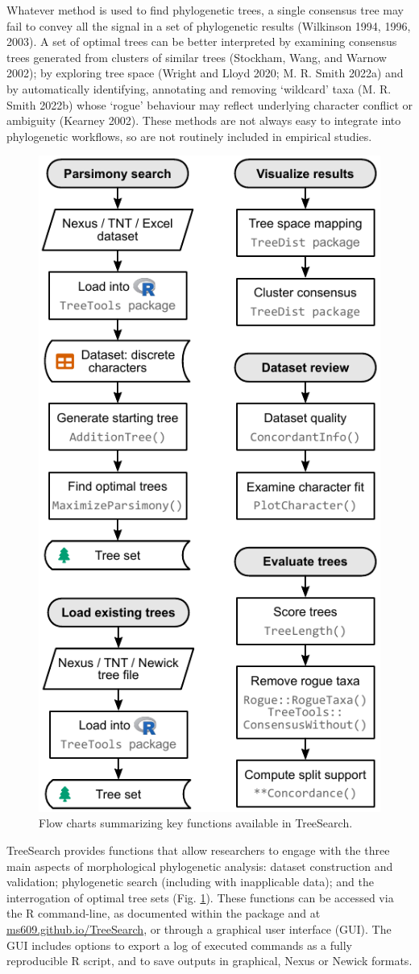 Whatever method is used to find phylogenetic trees, a single consensus tree may
fail to convey all the signal in a set of phylogenetic results (Wilkinson 1994, 1996, 2003). A set of optimal trees can be better
interpreted by examining consensus trees generated from clusters of similar
trees (Stockham, Wang, and Warnow 2002); by exploring tree space (Wright and Lloyd 2020; M. R. Smith 2022a) and by
automatically identifying, annotating and removing `wildcard' taxa (M. R. Smith 2022b)
whose `rogue' behaviour may reflect underlying character conflict or ambiguity
(Kearney 2002). These methods are not always easy to integrate into phylogenetic
workflows, so are not routinely included in empirical studies.

\begin{figure}

{\centering \includegraphics[width=0.6\linewidth]{Flow} 

}

\caption{Flow charts summarizing key functions available in TreeSearch.}\label{fig:flowchart}
\end{figure}

TreeSearch provides functions that allow researchers to engage with the three
main aspects of morphological phylogenetic analysis: dataset construction and
validation; phylogenetic search (including with inapplicable data); and the
interrogation of optimal tree sets (Fig. \ref{fig:flowchart}). These functions
can be accessed via the R command-line, as documented within the package and at
\href{https://ms609.github.io/TreeSearch/}{ms609.github.io/TreeSearch}, or through a
graphical user interface (GUI). The GUI includes options to export a log of
executed commands as a fully reproducible R script, and to save outputs in
graphical, Nexus or Newick formats.

